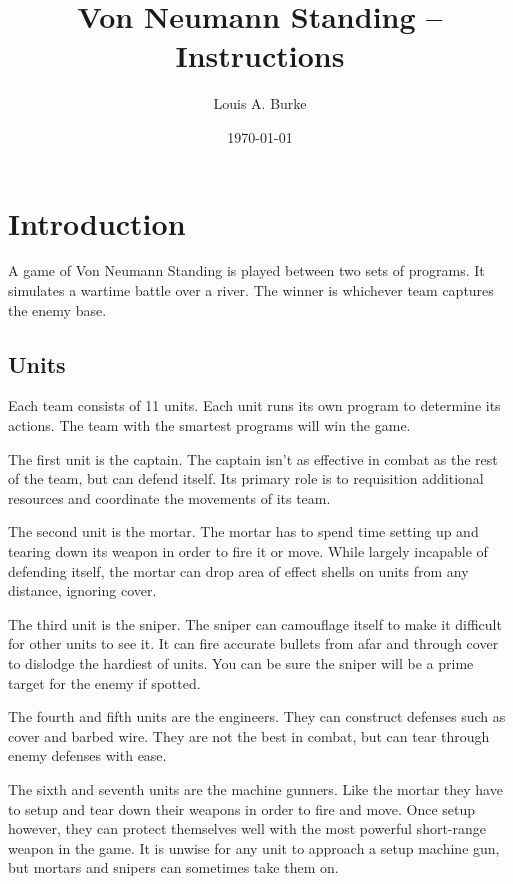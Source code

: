\documentclass{article}
\title{Von Neumann Standing -- Instructions}
\date{\today}
\author{Louis A. Burke}
\begin{document}
\maketitle
\clearpage
\tableofcontents
\clearpage
\listoftables
\clearpage

\section{Introduction}

A game of Von Neumann Standing is played between two sets of programs. It
simulates a wartime battle over a river. The winner is whichever team captures
the enemy base.

\subsection{Units}

Each team consists of 11 units. Each unit runs its own program to determine its
actions. The team with the smartest programs will win the game.

The first unit is the captain. The captain isn't as effective in combat as the
rest of the team, but can defend itself. Its primary role is to requisition
additional resources and coordinate the movements of its team.

The second unit is the mortar. The mortar has to spend time setting up and
tearing down its weapon in order to fire it or move. While largely incapable of
defending itself, the mortar can drop area of effect shells on units from any
distance, ignoring cover.

The third unit is the sniper. The sniper can camouflage itself to make it
difficult for other units to see it. It can fire accurate bullets from afar and
through cover to dislodge the hardiest of units. You can be sure the sniper will
be a prime target for the enemy if spotted.

The fourth and fifth units are the engineers. They can construct defenses such
as cover and barbed wire. They are not the best in combat, but can tear through
enemy defenses with ease.

The sixth and seventh units are the machine gunners. Like the mortar they have
to setup and tear down their weapons in order to fire and move. Once setup
however, they can protect themselves well with the most powerful short-range
weapon in the game. It is unwise for any unit to approach a setup machine gun,
but mortars and snipers can sometimes take them on.
\end{document}
